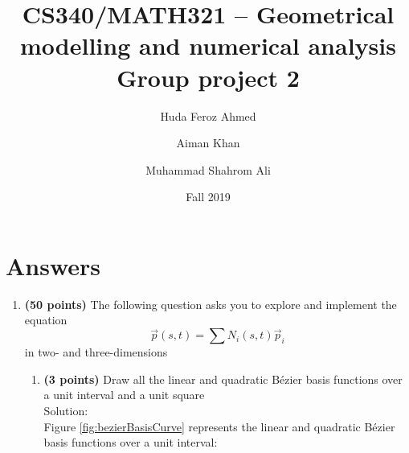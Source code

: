 \documentclass[a4paper, 11pt]{article}
\title{CS340/MATH321 -- Geometrical modelling and numerical analysis \\ Group project 2}
\date{Fall 2019}
\author{Huda Feroz Ahmed \and Aiman Khan \and Muhammad Shahrom Ali}
\begin{document}
\maketitle  
\setlength{\parskip}{10pt}
\setlength{\parindent}{0pt}


\section*{Answers}
\begin{enumerate}
    
\item \textbf{(50 points)} The following question asks you to explore and implement the equation \[\vec p(s, t) = \sum N_i(s, t) \vec p_i\] in two- and three-dimensions

\begin{enumerate}[label=\alph*.]
    \item \textbf{(3 points)} Draw all the linear and quadratic B\'{e}zier basis functions over a unit interval and a unit square \\
    Solution: \\
    Figure \ref{fig:bezierBasisCurve} represents the linear and quadratic B\'{e}zier basis functions over a unit interval: 
    \begin{figure}[ht] 
 \quad 
\end{figure}
\end{enumerate}
\end{enumerate}
\end{document}
